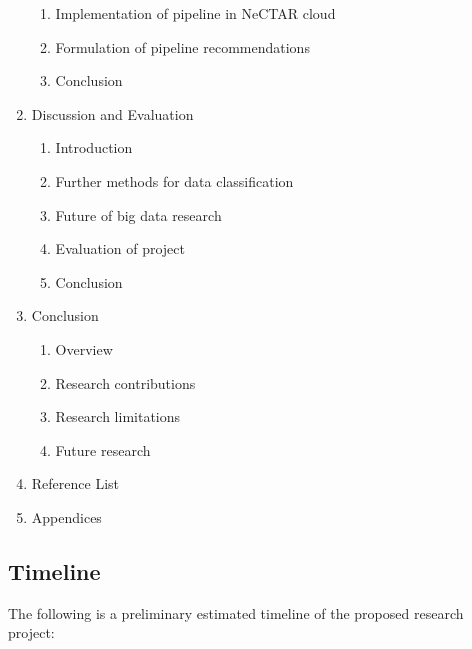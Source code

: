 \documentclass[a4paper,11pt]{article}
\begin{document}
\begin{enumerate}
\begin{enumerate}[label*=\arabic*.]
    \item Implementation of pipeline in NeCTAR cloud
    \item Formulation of pipeline recommendations
    \item Conclusion
  \end{enumerate}
  \item Discussion and Evaluation
  \begin{enumerate}[label*=\arabic*.]
    \item Introduction
    \item Further methods for data classification
    \item Future of big data research
    \item Evaluation of project
    \item Conclusion
  \end{enumerate}
  \item Conclusion
  \begin{enumerate}[label*=\arabic*.]
    \item Overview
    \item Research contributions
    \item Research limitations
    \item Future research
  \end{enumerate}
  \item Reference List
  \item Appendices
\end{enumerate}


\subsection{Timeline} %
\label{sub:timeline}

The following is a preliminary estimated timeline of the proposed research project:
\end{document}
